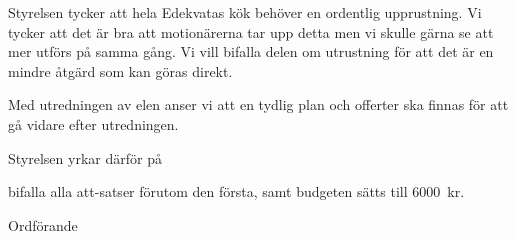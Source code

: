 \documentclass[../_main/handlingar.tex]{subfiles}
\begin{document}
\motionssvar
Styrelsen tycker att hela Edekvatas kök behöver en ordentlig upprustning. Vi tycker att det är bra att motionärerna tar upp detta men vi skulle gärna se att mer utförs på samma gång. Vi vill bifalla delen om utrustning för att det är en mindre åtgärd som kan göras direkt.

Med utredningen av elen anser vi att en tydlig plan och offerter ska finnas för att gå vidare efter utredningen. 

Styrelsen yrkar därför på

\begin{attsatser}
	\att bifalla alla att-satser förutom den första, samt
	\att budgeten sätts till \SI{6000}{kr}.
\end{attsatser}


\begin{signatures}{1}
	\ist
	\signature{Daniel Bakic}{Ordförande}
\end{signatures}
\end{document}
